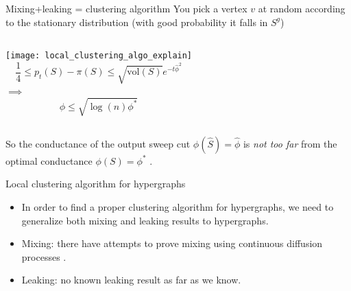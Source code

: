 \documentclass[../main.tex]{subfiles}
\begin{document}
    \begin{frame}{Mixing+leaking = clustering algorithm}
            You pick a vertex $v$ at random according to the stationary distribution (with good probability it falls in $S^g$)
            
            \begin{columns}
            	\texttt{[image: local\_clustering\_algo\_explain]}
            	\begin{equation*}
            	    \frac{1}{4} \leq p_t(S) - \pi(S) \leq \sqrt{\text{vol}(S)}e^{-t\hat{\phi}^2}
            	\end{equation*}
            	$\implies$
            	\begin{equation}
            		\hat{\phi} \leq \sqrt{\log(n) \phi^*}
            	\end{equation}
           	\end{columns}
           
            So the conductance of the output sweep cut $\phi(\hat{S}) = \hat{\phi}$ is \textit{not too far} from the optimal conductance $\phi(S) = \phi^*$ \cite{SpielmanClustering}.

    \end{frame}
    
    \begin{frame}{Local clustering algorithm for hypergraphs}
        \begin{itemize}
            \item In order to find a proper clustering algorithm for hypergraphs, we need to generalize both mixing and leaking results to hypergraphs. 
            \item Mixing: there have attempts to prove mixing using continuous diffusion processes \cite{Takai_2020}.
            \item Leaking: no known leaking result as far as we know.
        \end{itemize}
    \end{frame}
\end{document}
